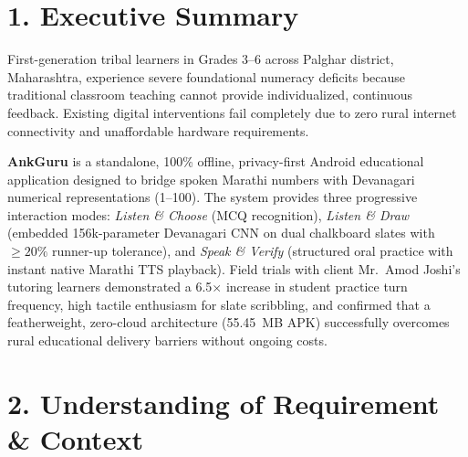 \documentclass[10pt,a4paper]{article}
\begin{document}
\section*{1. Executive Summary}
\begin{tcolorbox}[colback=slatebg,colframe=secondary,boxrule=0.6pt,arc=2pt,left=5pt,right=5pt,top=2pt,bottom=2pt]
\footnotesize
First-generation tribal learners in Grades 3--6 across Palghar district, Maharashtra, experience severe foundational numeracy deficits because traditional classroom teaching cannot provide individualized, continuous feedback. Existing digital interventions fail completely due to zero rural internet connectivity and unaffordable hardware requirements. 

\textbf{AnkGuru} is a standalone, 100\% offline, privacy-first Android educational application designed to bridge spoken Marathi numbers with Devanagari numerical representations (1--100). The system provides three progressive interaction modes: \textit{Listen \& Choose} (MCQ recognition), \textit{Listen \& Draw} (embedded 156k-parameter Devanagari CNN on dual chalkboard slates with $\ge 20\%$ runner-up tolerance), and \textit{Speak \& Verify} (structured oral practice with instant native Marathi TTS playback). Field trials with client Mr.~Amod Joshi's tutoring learners demonstrated a 6.5$\times$ increase in student practice turn frequency, high tactile enthusiasm for slate scribbling, and confirmed that a featherweight, zero-cloud architecture (55.45~MB APK) successfully overcomes rural educational delivery barriers without ongoing costs.
\end{tcolorbox}

\vspace{-3pt}
\section*{2. Understanding of Requirement \& Context}
\end{document}

